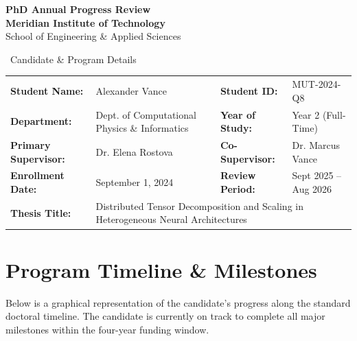 \begin{center}
  {\color{primary}\sffamily\huge\bfseries PhD Annual Progress Review}\\[0.2cm]
  {\color{secondary}\sffamily\Large\bfseries Meridian Institute of Technology}\\[0.1cm]
  {\color{neutral}\sffamily\normalsize School of Engineering \& Applied Sciences}\\[0.6cm]
\end{center}

\begin{infobox}{\faUser\ Candidate \& Program Details}
  \begin{tabularx}{\textwidth}{l X l X}
    \textbf{Student Name:} & Alexander Vance & \textbf{Student ID:} & MUT-2024-Q8 \\
    \textbf{Department:} & Dept. of Computational Physics \& Informatics & \textbf{Year of Study:} & Year 2 (Full-Time) \\
    \textbf{Primary Supervisor:} & Dr. Elena Rostova & \textbf{Co-Supervisor:} & Dr. Marcus Vance \\
    \textbf{Enrollment Date:} & September 1, 2024 & \textbf{Review Period:} & Sept 2025 -- Aug 2026 \\
    \textbf{Thesis Title:} & \multicolumn{3}{l}{Distributed Tensor Decomposition and Scaling in Heterogeneous Neural Architectures} \\
  \end{tabularx}
\end{infobox}

\section{Program Timeline \& Milestones}
Below is a graphical representation of the candidate's progress along the standard doctoral timeline. The candidate is currently on track to complete all major milestones within the four-year funding window.

